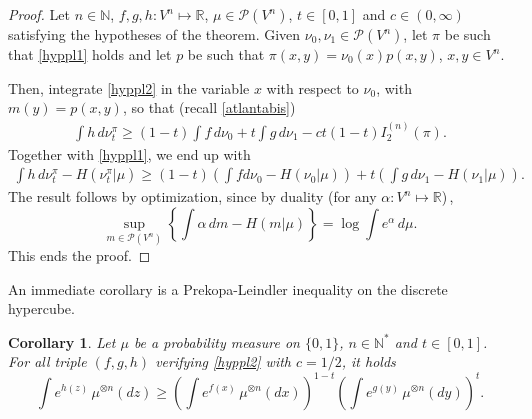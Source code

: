 \documentclass[11pt]{amsart}
\newtheorem{cor}[equation]{Corollary}
\numberwithin{equation}{section}
\begin{document}
\begin{proof}
Let $n \in \mathbb{N}$, $f, g, h : V^n \mapsto {\mathbb{R}} $,  $\mu \in \mathcal{P}(V^n)$,  $t \in [0,1]$ and $c \in (0, \infty)$
satisfying the hypotheses of the theorem. Given $\nu_0, \nu_1 \in \mathcal{P}(V^n)$, let $\pi$ be such that \eqref{hyppl1} 
 holds and let $p$ be such that $\pi(x,y)=\nu_0(x)p(x,y)$, $x,y \in V^n$.

Then, integrate \eqref{hyppl2} in the variable $x$ with respect to $\nu_0$, with $m(y)=p(x,y)$, so that (recall \eqref{atlantabis})
\begin{align*} 
 \int h \,d\nu_t^{\pi}   
 \geq 
(1-t) \int f\,d\nu_0  + t \int  g\,d\nu_1   
 -ct(1-t) I_2^{(n)}(\pi) .
\end{align*}
Together with \eqref{hyppl1}, we end up with
\begin{align*} 
 \int h \,d\nu_t^{\pi}   - H(\nu_t^\pi |\mu)
 \geq 
(1-t) \left( \int f d\nu_0 - H(\nu_0|\mu) \right) + t \left( \int g\,d\nu_1   - H(\nu_1|\mu)\right) .
\end{align*}
The result follows by optimization, since by duality (for any $\alpha \colon V^n \mapsto {\mathbb{R}} $)\,,
$$
\sup_{m \in \mathcal{P}(V^n)} \left\{ \int \alpha\,dm - H(m|\mu) \right\} = \log \int e^\alpha\,d\mu .
$$
This ends the proof.
\end{proof}An immediate corollary is a Prekopa-Leindler inequality on the discrete hypercube.
\begin{cor}\label{PL-cube}
Let $\mu$ be a probability measure on $\{0,1\}$, $n\in {\mathbb{N}}^*$ and $t\in [0,1]$. For all triple $(f,g,h)$ verifying \eqref{hyppl2} with $c=1/2$, it holds
$$
\int e^{h(z)}\,\mu^{\otimes n}(dz) \geq \left( \int e^{f(x)}\,\mu^{\otimes n}(dx) \right)^{1-t} \left( \int e^{g(y)} \,\mu^{\otimes n}(dy) \right)^t  .
$$
\end{cor}
\end{document}
